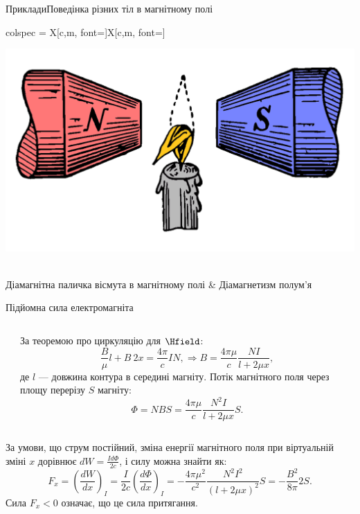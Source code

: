 \documentclass[onlytextwidth]{beamer}
\begin{document}
\begin{frame}{Приклади}{Поведінка різних тіл в магнітному полі}
\begin{tblr}{
		colspec = {X[c,m, font=\small]X[c,m, font=\small]}
		}
		\begin{pict}\includegraphics[width=0.5\linewidth]{Flame_diamagnet}\end{pict}                                                     \\
		Діамагнітна паличка вісмута в магнітному полі                             & Діамагнетизм полум'я
	\end{tblr}
\end{frame}



\begin{frame}{Підйомна сила електромагніта}{}
	\begin{columns}
		\begin{column}{0.3\linewidth}
            
		\end{column}
		\begin{column}{0.69\linewidth}
			\begin{block}{}\justifying
				За теоремою про циркуляцію для $\Hfield$:
				\begin{equation*}
					\frac{B}{\mu} l + B\ 2x = \frac{4\pi}{c} IN, \Rightarrow B = \frac{4\pi\mu}{c} \frac{NI}{l + 2\mu x},
				\end{equation*}
				де $l$ --- довжина контура в середині магніту.
				Потік магнітного поля через площу перерізу $S$ магніту:
				\begin{equation*}
					\Phi = NBS = \frac{4\pi\mu}{c} \frac{N^2I}{l + 2\mu x} S.
				\end{equation*}
			\end{block}
		\end{column}
	\end{columns}
	\begin{block}{}\justifying
		За умови, що струм постійний, зміна енергії магнітного поля при віртуальній зміні $x$ дорівнює $dW = \frac{I d\Phi}{2c}$,
		і силу можна знайти як:
		\begin{equation*}
			F_x =  \left( \frac{d W}{dx} \right)_{I} = \frac{I}{2c} \left( \frac{d \Phi}{dx} \right)_{I} = -\frac{4\pi\mu^2}{c^2}\frac{N^2I^2}{(l + 2\mu
				x)^2} S = -\frac{B^2}{8\pi} 2S.
		\end{equation*}Сила $F_x <0 $ означає, що це сила притягання.
	\end{block}
\end{frame}
\end{document}
